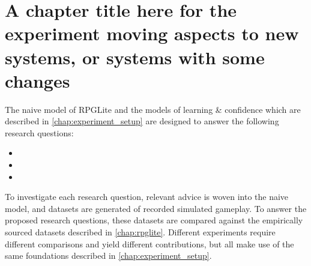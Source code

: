 \chapter{A chapter title here for the experiment moving aspects to new systems,
  or systems with some changes}
\label{chap:exp2_old_aspects_new_systems}
\label{chap:experimental_results}
\label{sec:optimisation_with_aspects_experimental_results}



The naive model of RPGLite and the \aspectoriented models of learning \&
confidence which are described in \cref{chap:experiment_setup} are designed to
answer the following research questions:

\begin{researchquestion}
  \begin{itemize}
\item \rqtwo{}
\item \rqthree{}
\item \rqfour{}
  \end{itemize}
\end{researchquestion}


To investigate each research question, relevant advice is woven into the naive
model, and datasets are generated of recorded simulated gameplay. To answer the
proposed research questions, these datasets are compared against the empirically
sourced datasets described in \cref{chap:rpglite}. Different experiments require
different comparisons and yield different contributions, but all make use of the
same foundations described in \cref{chap:experiment_setup}.

